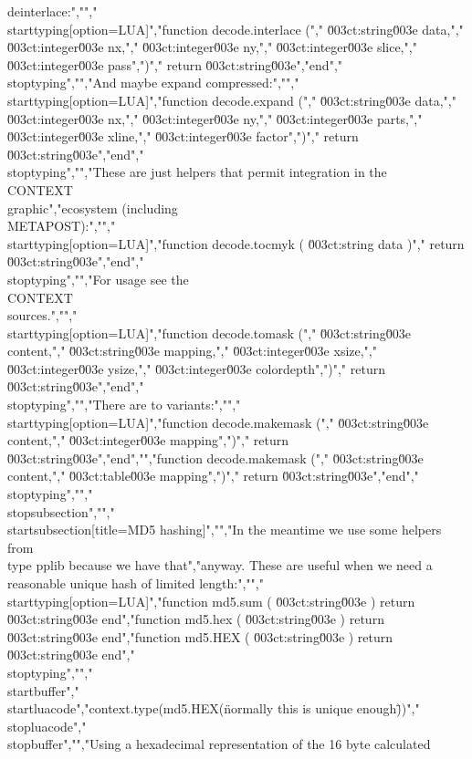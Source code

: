 deinterlace:","","\\starttyping[option=LUA]","function decode.interlace (","    \u003ct:string\u003e  data,","    \u003ct:integer\u003e nx,","    \u003ct:integer\u003e ny,","    \u003ct:integer\u003e slice,","    \u003ct:integer\u003e pass",")","    return \u003ct:string\u003e","end","\\stoptyping","","And maybe expand compressed:","","\\starttyping[option=LUA]","function decode.expand (","    \u003ct:string\u003e  data,","    \u003ct:integer\u003e nx,","    \u003ct:integer\u003e ny,","    \u003ct:integer\u003e parts,","    \u003ct:integer\u003e xline,","    \u003ct:integer\u003e factor",")","    return \u003ct:string\u003e","end","\\stoptyping","","These are just helpers that permit integration in the \\CONTEXT\\ graphic","ecosystem (including \\METAPOST):","","\\starttyping[option=LUA]","function decode.tocmyk ( \u003ct:string data )","    return \u003ct:string\u003e","end","\\stoptyping","","For usage see the \\CONTEXT\\ sources.","","\\starttyping[option=LUA]","function decode.tomask (","    \u003ct:string\u003e  content,","    \u003ct:string\u003e  mapping,","    \u003ct:integer\u003e xsize,","    \u003ct:integer\u003e ysize,","    \u003ct:integer\u003e colordepth",")","    return \u003ct:string\u003e","end","\\stoptyping","","There are to variants:","","\\starttyping[option=LUA]","function decode.makemask (","    \u003ct:string\u003e  content,","    \u003ct:integer\u003e mapping",")","    return \u003ct:string\u003e","end","","function decode.makemask (","    \u003ct:string\u003e content,","    \u003ct:table\u003e  mapping",")","    return \u003ct:string\u003e","end","\\stoptyping","","\\stopsubsection","","\\startsubsection[title=MD5 hashing]","","In the meantime we use some helpers from \\type {pplib} because we have that","anyway. These are useful when we need a reasonable unique hash of limited length:","","\\starttyping[option=LUA]","function md5.sum ( \u003ct:string\u003e ) return \u003ct:string\u003e end","function md5.hex ( \u003ct:string\u003e ) return \u003ct:string\u003e end","function md5.HEX ( \u003ct:string\u003e ) return \u003ct:string\u003e end","\\stoptyping","","\\startbuffer","\\startluacode","context.type(md5.HEX(\"normally this is unique enough\"))","\\stopluacode","\\stopbuffer","","Using a hexadecimal representation of the 16 byte calculated 